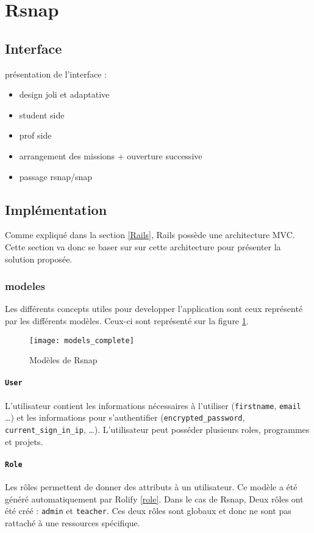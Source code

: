 \section{Rsnap}
\graphicspath{{content/7-solution/3-rsnap/images/}}

\subsection{Interface}
présentation de l'interface :
\begin{itemize}
  \item design joli et adaptative
  \item student side
  \item prof side
  \item arrangement des missions + ouverture successive
  \item passage rsnap/snap
\end{itemize}

\subsection{Implémentation}
Comme expliqué dans la section \ref{Rails}, Rails possède une architecture MVC. Cette section va donc se baser sur sur cette architecture pour présenter la solution proposée.

\subsubsection{modeles}
Les différents concepts utiles pour developper l'application sont ceux représenté par les différents modèles. Ceux-ci sont représenté sur la figure \ref{fig:models}.
\begin{figure}
 \begin{center}
   \texttt{[image: models\_complete]}
   \caption{Modèles de Rsnap}
   \label{fig:models}
 \end{center}
\end{figure}
\paragraph{\texttt{User}} L'utilisateur contient les informations nécessaires à l'utiliser (\texttt{firstname}, \texttt{email} \ldots) et les informations pour s'authentifier (\texttt{encrypted\_password}, \texttt{current\_sign\_in\_ip}, \ldots). L'utilisateur peut posséder plusieurs roles, programmes et projets.
\paragraph{\texttt{Role}} Les rôles permettent de donner des attributs à un utilisateur. Ce modèle a été généré automatiquement par Rolify \ref{role}. Dans le cas de Rsnap, Deux rôles ont été créé : \texttt{admin} et \texttt{teacher}. Ces deux rôles sont globaux et donc ne sont pas rattaché à une ressources spécifique.%


